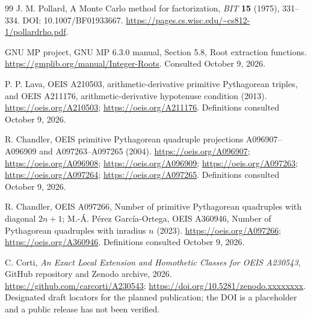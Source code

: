 \documentclass[11pt]{article}
\theoremstyle{definition}
\begin{document}
\begin{thebibliography}{99}
J. M. Pollard, A Monte Carlo method for factorization,
\emph{BIT} \textbf{15} (1975), 331--334.
DOI: 10.1007/BF01933667.
\url{https://pages.cs.wisc.edu/~cs812-1/pollardrho.pdf}.

GNU MP project, GNU MP 6.3.0 manual, Section 5.8, Root extraction functions.
\url{https://gmplib.org/manual/Integer-Roots}. Consulted October 9, 2026.

P. P. Lava, OEIS A210503, arithmetic-derivative primitive Pythagorean
triples, and OEIS A211176, arithmetic-derivative hypotenuse condition
(2013). \url{https://oeis.org/A210503}; \url{https://oeis.org/A211176}.
Definitions consulted October 9, 2026.

R. Chandler, OEIS primitive Pythagorean quadruple projections
A096907--A096909 and A097263--A097265 (2004).
\url{https://oeis.org/A096907}; \url{https://oeis.org/A096908};
\url{https://oeis.org/A096909}; \url{https://oeis.org/A097263};
\url{https://oeis.org/A097264}; \url{https://oeis.org/A097265}.
Definitions consulted October 9, 2026.

R. Chandler, OEIS A097266, Number of primitive Pythagorean quadruples
with diagonal $2n+1$;
M.-\'{A}. P\'{e}rez Garc\'{i}a-Ortega, OEIS A360946,
Number of Pythagorean quadruples with inradius $n$ (2023).
\url{https://oeis.org/A097266}; \url{https://oeis.org/A360946}.
Definitions consulted October 9, 2026.

C. Corti, \emph{An Exact Local Extension and Homothetic Classes for
OEIS A230543}, GitHub repository and Zenodo archive, 2026.
\url{https://github.com/carcorti/A230543};
\url{https://doi.org/10.5281/zenodo.xxxxxxxx}.
Designated draft locators for the planned publication; the DOI is a
placeholder and a public release has not been verified.
\end{thebibliography}
\endgroup
\end{document}
